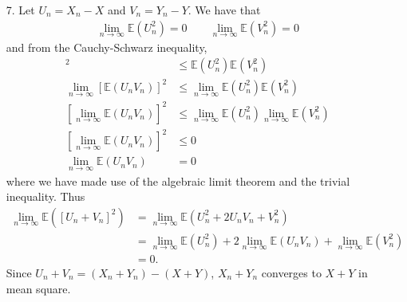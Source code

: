 \documentclass[a4paper,12pt]{article}
\begin{document}
\begin{enumerate}
    \item[7.]
        Let $U_n = X_n - X$ and $V_n = Y_n - Y$. We have that
        \begin{align*}
            \lim_{n \to \infty} \mathbb{E}(U_n^2) = 0 \qquad \lim_{n \to \infty} \mathbb{E}(V_n^2) = 0
        \end{align*}
        and from the Cauchy-Schwarz inequality,
        \begin{align*}
            [\mathbb{E} (U_n V_n)]^2 &\leq \mathbb{E}(U_n^2) \mathbb{E}(V_n^2) \\
            \lim_{n \to \infty}[\mathbb{E} (U_n V_n)]^2 &\leq \lim_{n \to \infty} \mathbb{E}(U_n^2) \mathbb{E}(V_n^2) \\
            [\lim_{n \to \infty} \mathbb{E} (U_n V_n)]^2 &\leq \lim_{n \to \infty} \mathbb{E}(U_n^2) \lim_{n \to \infty} \mathbb{E}(V_n^2) \\
            [\lim_{n \to \infty} \mathbb{E} (U_n V_n)]^2 &\leq 0 \\
            \lim_{n \to \infty} \mathbb{E} (U_n V_n) &= 0
        \end{align*}
        where we have made use of the algebraic limit theorem and the trivial inequality. Thus
        \begin{align*}
            \lim_{n \to \infty} \mathbb{E}([U_n + V_n]^2) &= \lim_{n \to \infty} \mathbb{E}(U_n^2 + 2U_nV_n + V_n^2) \\
            &= \lim_{n \to \infty} \mathbb{E}(U_n^2) + 2\lim_{n \to \infty} \mathbb{E}(U_n V_n) + \lim_{n \to \infty} \mathbb{E}(V_n^2) \\
            &= 0.
        \end{align*}
        Since $U_n + V_n = (X_n + Y_n) - (X + Y)$, $X_n + Y_n$ converges to $X + Y$ in mean square.


\end{enumerate}
\end{document}
